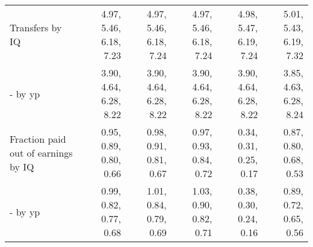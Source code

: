 \begin{tabular}{lrrrrr}
Transfers by IQ & 4.97, 5.46, 6.18, 7.23  & 4.97, 5.46, 6.18, 7.24  & 4.97, 5.46, 6.18, 7.24  & 4.98, 5.47, 6.19, 7.24  & 5.01, 5.43, 6.19, 7.32  \\ 
- by yp & 3.90, 4.64, 6.28, 8.22  & 3.90, 4.64, 6.28, 8.22  & 3.90, 4.64, 6.28, 8.22  & 3.90, 4.64, 6.28, 8.22  & 3.85, 4.63, 6.28, 8.24  \\ 
Fraction paid out of earnings by IQ & 0.95, 0.89, 0.80, 0.66  & 0.98, 0.91, 0.81, 0.67  & 0.97, 0.93, 0.84, 0.72  & 0.34, 0.31, 0.25, 0.17  & 0.87, 0.80, 0.68, 0.53  \\ 
- by yp & 0.99, 0.82, 0.77, 0.68  & 1.01, 0.84, 0.79, 0.69  & 1.03, 0.90, 0.82, 0.71  & 0.38, 0.30, 0.24, 0.16  & 0.89, 0.72, 0.65, 0.56  \\ 
\hline
\end{tabular}%
